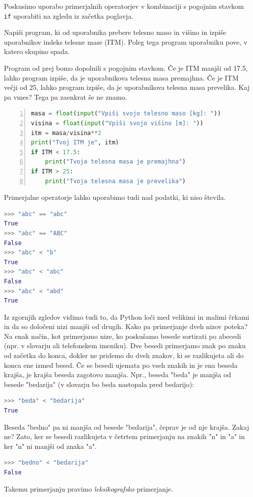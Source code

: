 Poskusimo uporabo primerjalnih operatorjev v kombinaciji s pogojnim stavkom \texttt{if} uporabiti na zgledu iz začetka poglavja.
\begin{zgled}
Napiši program, ki od uporabnika prebere telesno maso in višino in izpiše uporabnikov indeks telesne mase (ITM). Poleg tega program uporabniku pove, v katero skupino spada. 
\end{zgled}
\begin{resitev}
Program od prej bomo dopolnili s pogojnim stavkom. Če je ITM manjši od 17.5, lahko program izpiše, da je uporabnikova telesna masa premajhna. Če je ITM večji od 25, lahko program izpiše, da je uporabnikova telesna masa prevelika. Kaj pa vmes? Tega pa zaenkrat še ne znamo. 
\begin{lstlisting}[language=Python,numbers=left]
masa = float(input("Vpiši svojo telesno maso [kg]: "))
visina = float(input("Vpiši svojo višino [m]: "))
itm = masa/visina**2
print("Tvoj ITM je", itm)
if ITM < 17.5:
    print("Tvoja telesna masa je premajhna")
if ITM > 25:
    print("Tvoja telesna masa je prevelika")
\end{lstlisting}
\end{resitev}

Primerjalne operatorje lahko uporabimo tudi nad podatki, ki niso števila.
\begin{lstlisting}[language=Python]
>>> "abc" == "abc"
True
>>> "abc" == "ABC"
False
>>> "abc" < "b"
True
>>> "abc" < "abc"
False
>>> "abc" < "abd"
True
\end{lstlisting}
Iz zgornjih zgledov vidimo tudi to, da Python loči med velikimi in malimi črkami in da so določeni nizi manjši od drugih. Kako pa primerjanje dveh nizov poteka? Na enak način, kot primerjamo nize, ko poskušamo besede sortirati po abecedi (npr. v slovarju ali telefonskem imeniku). Dve besedi primerjamo znak po znaku od začetka do konca, dokler ne pridemo do dveh znakov, ki se razlikujeta ali do konca ene izmed besed. Če se besedi ujemata po vseh znakih in je ena beseda krajša, je krajša beseda zagotovo manjša. Npr., beseda "beda" je manjša od besede "bedarija" (v slovarju bo beda nastopala pred bedarijo):
\begin{lstlisting}[language=Python]
>>> "beda" < "bedarija"
True
\end{lstlisting}
Beseda "bedno" pa ni manjša od besede "bedarija", čeprav je od nje krajša. Zakaj ne? Zato, ker se besedi razlikujeta v četrtem primerjanju na znakih "n" in "a" in ker "n" ni manjši od znaka "a".
\begin{lstlisting}[language=Python]
>>> "bedno" < "bedarija"
False
\end{lstlisting}
Takemu primerjanju pravimo \emph{leksikografsko} primerjanje. 


